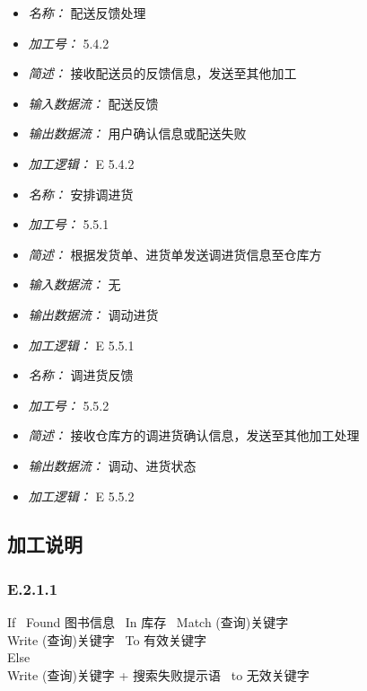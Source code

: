 \vspace{-1mm}


\begin{itemize}
\item \textit{名称： }配送反馈处理
\item \textit{加工号： }5.4.2
\item \textit{简述： } 接收配送员的反馈信息，发送至其他加工 
\item \textit{输入数据流： } 配送反馈
\item \textit{输出数据流： } 用户确认信息或配送失败 
\item \textit{加工逻辑： } E 5.4.2

\end{itemize}


\vspace{-1mm}


\begin{itemize}
\item \textit{名称： }安排调进货
\item \textit{加工号： }5.5.1
\item \textit{简述： } 根据发货单、进货单发送调进货信息至仓库方 
\item \textit{输入数据流： } 无
\item \textit{输出数据流： } 调动进货
\item \textit{加工逻辑： } E 5.5.1

\end{itemize}


\vspace{-1mm}


\begin{itemize}
\item \textit{名称： }调进货反馈
\item \textit{加工号： }5.5.2
\item \textit{简述： } 接收仓库方的调进货确认信息，发送至其他加工处理 
\item \textit{输出数据流： } 调动、进货状态
\item \textit{加工逻辑： } E 5.5.2

\end{itemize}


\vspace{-1mm}

\subsection{加工说明}
\subsubsection*{E.2.1.1}
If \ Found 图书信息 \ In 库存 \ Match (查询)关键字 \\
\indent Write (查询)关键字 \ To 有效关键字  \\
Else \\
\indent Write (查询)关键字 + 搜索失败提示语 \ to 无效关键字 \\
\vspace{-1mm}
